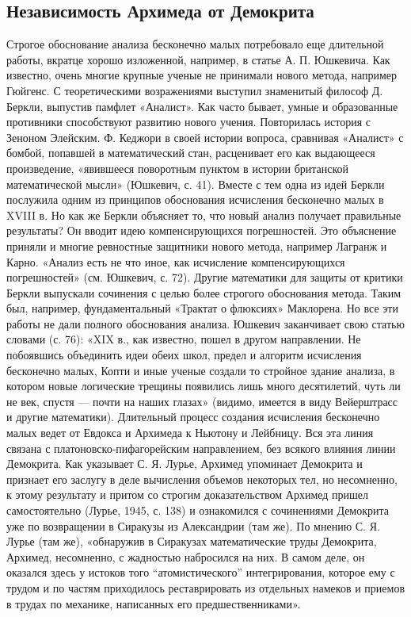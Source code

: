 \subsection{Независимость Архимеда от Демокрита}

Строгое обоснование анализа бесконечно малых потребовало еще
длительной работы, вкратце хорошо изложенной, например, в статье А. П.
Юшкевича. Как известно, очень многие крупные ученые не принимали
нового метода, например Гюйгенс. С теоретическими возражениями
выступил знаменитый философ Д. Беркли, выпустив памфлет «Аналист». Как
часто бывает, умные и образованные противники способствуют развитию
нового учения. Повторилась история с Зеноном Элейским. Ф. Кеджори в
своей истории вопроса, сравнивая «Аналист» с бомбой, попавшей в
математический стан, расценивает его как выдающееся произведение,
«явившееся поворотным пунктом в истории британской математической
мысли» (Юшкевич, с. 41). Вместе с тем одна из идей Беркли послужила
одним из принципов обоснования исчисления бесконечно малых в XVIII в.
Но как же Беркли объясняет то, что новый анализ получает правильные
результаты? Он вводит идею компенсирующихся погрешностей. Это
объяснение приняли и многие ревностные защитники нового метода,
например Лагранж и Карно. «Анализ есть не что иное, как исчисление
компенсирующихся погрешностей» (см. Юшкевич, с. 72). Другие математики
для защиты от критики Беркли выпускали сочинения с целью более
строгого обоснования метода. Таким был, например, фундаментальный
«Трактат о флюксиях» Маклорена. Но все эти работы не дали полного
обоснования анализа. Юшкевич заканчивает свою статью словами (с. 76):
«XIX в., как известно, пошел в другом направлении. Не побоявшись
объединить идеи обеих школ, предел и алгоритм исчисления бесконечно
малых, Копти и иные ученые создали то стройное здание анализа, в
котором новые логические трещины появились лишь много десятилетий,
чуть ли не век, спустя --- почти на наших глазах» (видимо, имеется в
виду Вейерштрасс и другие математики). Длительный процесс создания
исчисления бесконечно малых ведет от Евдокса и Архимеда к Ньютону и
Лейбницу. Вся эта линия связана с платоновско-пифагорейским
направлением, без всякого влияния линии Демокрита. Как указывает С. Я.
Лурье, Архимед упоминает Демокрита и признает его заслугу в деле
вычисления объемов некоторых тел, но несомненно, к этому результату и
притом со строгим доказательством Архимед пришел самостоятельно
(Лурье, 1945, с. 138) и ознакомился с сочинениями Демокрита уже по
возвращении в Сиракузы из Александрии (там же). По мнению С. Я. Лурье
(там же), «обнаружив в Сиракузах математические труды Демокрита,
Архимед, несомненно, с жадностью набросился на них. В самом деле, он
оказался здесь у истоков того ``атомистического'' интегрирования,
которое ему с трудом и по частям приходилось реставрировать из
отдельных намеков и приемов в трудах по механике, написанных его
предшественниками».


